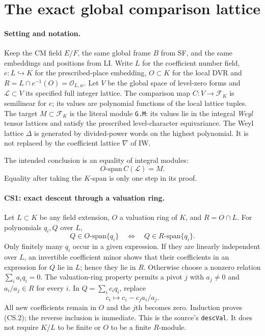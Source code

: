 \section{The exact global comparison lattice}
\label{sec:comparison-span}


\paragraph{Setting and notation.}
Keep the CM field $E/F$, the same global frame $B$ from SF, and the
same embeddings and positions from LI. Write $L$ for the coefficient
number field, $e:L\hookrightarrow K$ for the prescribed-place embedding,
$O\subset K$ for the local DVR and
$R=L\cap e^{-1}(O)=\mathcal O_{L,w}$.
Let $V$ be the global space of level-zero forms and
$\mathcal L\subset V$ its specified full integer lattice. The comparison
map $C:V\to\mathcal F_K$ is semilinear for $e$; its values are polynomial
functions of the local lattice tuples. The target $M\subset\mathcal F_K$
is the literal module \texttt{G.M}: its values lie in the integral
\emph{Weyl} tensor lattices and satisfy the prescribed level-character
equivariance. The Weyl lattice $\Delta$ is generated by divided-power
words on the highest polynomial. It is not replaced by the coefficient
lattice $\nabla$ of IW.

The intended conclusion is an equality of integral modules:
\[
 \boxed{\quad O\text{-span}\,C(\mathcal L)=M.\quad}       \tag{CS.1}
\]
Equality after taking the $K$-span is only one step in its proof.

\paragraph{CS1: exact descent through a valuation ring.}
Let $L\subset K$ be any field extension, $O$ a valuation ring of $K$,
and $R=O\cap L$. For polynomials $q_i,Q$ over $L$,
\[
 Q\in O\text{-span}\{q_i\}\quad\Longleftrightarrow\quad
 Q\in R\text{-span}\{q_i\}.                            \tag{CS.2}
\]
Only finitely many $q_i$ occur in a given expression. If they are
linearly independent over $L$, an invertible coefficient minor shows
that their coefficients in an expression for $Q$ lie in $L$; hence
they lie in $R$. Otherwise choose a nonzero relation
$\sum_i a_iq_i=0$. The valuation-ring property permits a pivot $j$
with $a_j\ne0$ and $a_i/a_j\in R$ for every $i$.
In $Q=\sum_i c_iq_i$, replace
\[
 c_i\longmapsto c_i-c_j a_i/a_j.
\]
All new coefficients remain in $O$ and the $j$th becomes zero.
Induction proves (CS.2); the reverse inclusion is immediate.
This is the source's \texttt{descVal}. It does not require $K/L$ to
be finite or $O$ to be a finite $R$-module.

